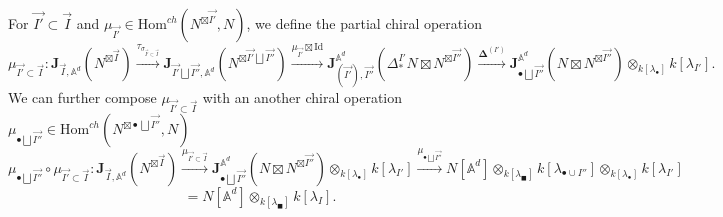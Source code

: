 \documentclass[11pt]{amsart}
\theoremstyle{definition}
\theoremstyle{remark}
\numberwithin{equation}{section}
\begin{document}
For $\vec{I'}\subset \vec{I}$ and $\mu_{\vec{I'}}\in   \mathrm{Hom}^{ch}(N^{\boxtimes\vec{I'}},N)$, we define the partial chiral operation
$$
\mu_{\vec{I'}\subset \vec{I}}:\mathbf{J}_{\vec{I},\mathbb{A}^d}(N^{\boxtimes\vec{I}})\xrightarrow{\tau_{\sigma_{\vec{I'}\subset\vec{I}}}}\mathbf{J}_{\vec{I'}\bigsqcup \vec{I''},\mathbb{A}^d}(N^{\boxtimes\vec{I'}\bigsqcup \vec{I''}})\xrightarrow{\mu_{\vec{I'}}\boxtimes \mathrm{Id}} \mathbf{J}_{(\vec{I'}),\vec{{I''}}}^{\mathbb{A}^d}(\Delta^{I'}_*N\boxtimes N^{\boxtimes\vec{I''}})\xrightarrow{\mathbf{\Delta}^{(I')}} \mathbf{J}_{\bullet\bigsqcup\vec{I''}}^{\mathbb{A}^d}(N\boxtimes N^{\boxtimes\vec{I''}})\otimes_{k[\lambda_{\bullet}]}k[\lambda_{I'}].
$$
We can further compose $\mu_{\vec{I'}\subset \vec{I}}$ with an another chiral operation $\mu_{\bullet \bigsqcup \vec{I''}}\in \mathrm{Hom}^{ch}(N^{\boxtimes \bullet \bigsqcup \vec{I''}},N)$
$$
\mu_{\bullet \bigsqcup \vec{I''}}\circ\mu_{\vec{I'}\subset \vec{I}}:\mathbf{J}_{\vec{I},\mathbb{A}^d}(N^{\boxtimes\vec{I}})\xrightarrow{\mu_{\vec{I'}\subset \vec{I}}} \mathbf{J}_{\bullet\bigsqcup\vec{I''}}^{\mathbb{A}^d}(N\boxtimes N^{\boxtimes\vec{I''}})\otimes_{k[\lambda_{\bullet}]}k[\lambda_{I'}]\xrightarrow{\mu_{\bullet \bigsqcup \vec{I''}}}N[\mathbb{A}^d]\otimes_{k[\lambda_{\blacksquare}]}k[\lambda_{\bullet\cup I''}]\otimes_{k[\lambda_{\bullet}]}k[\lambda_{I'}]
$$
$$
=N[\mathbb{A}^d]\otimes_{k[\lambda_{\blacksquare}]}k[\lambda_{I}].
$$
\end{document}
